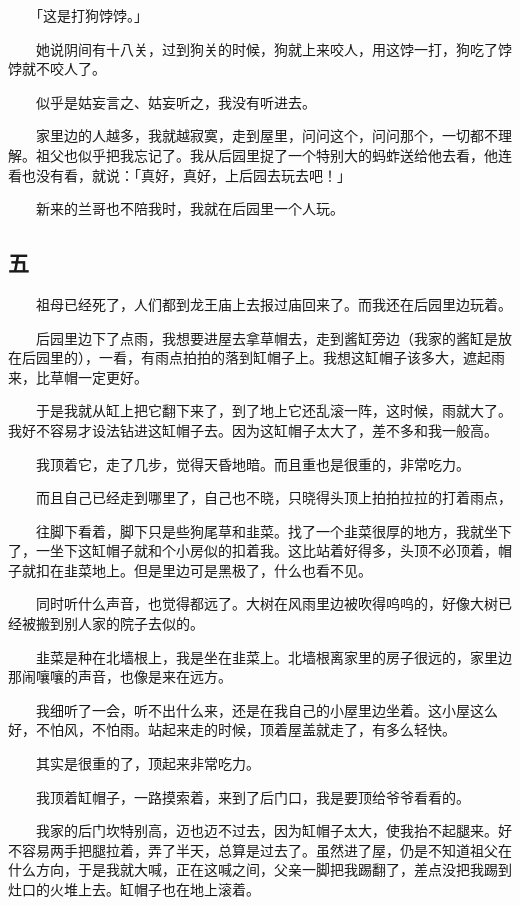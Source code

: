 \documentclass[UTF8]{ctexart}
\begin{document}
　　「这是打狗饽饽。」

　　她说阴间有十八关，过到狗关的时候，狗就上来咬人，用这饽一打，狗吃了饽饽就不咬人了。

　　似乎是姑妄言之、姑妄听之，我没有听进去。

　　家里边的人越多，我就越寂寞，走到屋里，问问这个，问问那个，一切都不理解。祖父也似乎把我忘记了。我从后园里捉了一个特别大的蚂蚱送给他去看，他连看也没有看，就说：「真好，真好，上后园去玩去吧！」

　　新来的兰哥也不陪我时，我就在后园里一个人玩。

\subsection{五}

　　祖母已经死了，人们都到龙王庙上去报过庙回来了。而我还在后园里边玩着。

　　后园里边下了点雨，我想要进屋去拿草帽去，走到酱缸旁边（我家的酱缸是放在后园里的），一看，有雨点拍拍的落到缸帽子上。我想这缸帽子该多大，遮起雨来，比草帽一定更好。

　　于是我就从缸上把它翻下来了，到了地上它还乱滚一阵，这时候，雨就大了。我好不容易才设法钻进这缸帽子去。因为这缸帽子太大了，差不多和我一般高。

　　我顶着它，走了几步，觉得天昏地暗。而且重也是很重的，非常吃力。

　　而且自己已经走到哪里了，自己也不晓，只晓得头顶上拍拍拉拉的打着雨点，

　　往脚下看着，脚下只是些狗尾草和韭菜。找了一个韭菜很厚的地方，我就坐下了，一坐下这缸帽子就和个小房似的扣着我。这比站着好得多，头顶不必顶着，帽子就扣在韭菜地上。但是里边可是黑极了，什么也看不见。

　　同时听什么声音，也觉得都远了。大树在风雨里边被吹得呜呜的，好像大树已经被搬到别人家的院子去似的。

　　韭菜是种在北墙根上，我是坐在韭菜上。北墙根离家里的房子很远的，家里边那闹嚷嚷的声音，也像是来在远方。

　　我细听了一会，听不出什么来，还是在我自己的小屋里边坐着。这小屋这么好，不怕风，不怕雨。站起来走的时候，顶着屋盖就走了，有多么轻快。

　　其实是很重的了，顶起来非常吃力。

　　我顶着缸帽子，一路摸索着，来到了后门口，我是要顶给爷爷看看的。

　　我家的后门坎特别高，迈也迈不过去，因为缸帽子太大，使我抬不起腿来。好不容易两手把腿拉着，弄了半天，总算是过去了。虽然进了屋，仍是不知道祖父在什么方向，于是我就大喊，正在这喊之间，父亲一脚把我踢翻了，差点没把我踢到灶口的火堆上去。缸帽子也在地上滚着。
\end{document}
